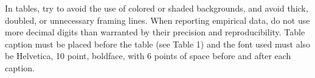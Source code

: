 \documentclass[12pt]{article}
\begin{document}
In tables, try to avoid the use of colored or shaded backgrounds, and avoid
thick, doubled, or unnecessary framing lines. When reporting empirical data, do
not use more decimal digits than warranted by their precision and
reproducibility. Table caption must be placed before the table (see Table 1)
and the font used must also be Helvetica, 10 point, boldface, with 6 points of
space before and after each caption.




\end{document}
